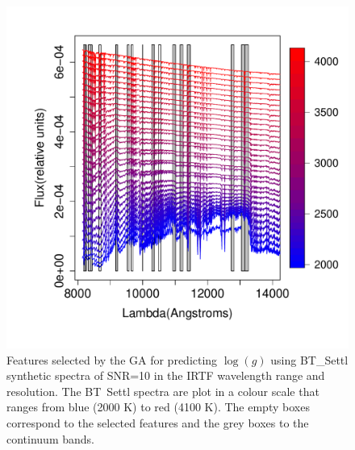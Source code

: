 \begin {figure}
 \centering
  \includegraphics[scale=0.55]{figs/BT-spectraAtIRTF-10-logg}
  \caption{Features selected by the GA for predicting $\log(g)$ using
    BT\_Settl synthetic spectra of SNR=10 in the IRTF wavelength range
    and resolution. The BT\ Settl spectra are plot in a colour scale
    that ranges from blue (2000 K) to red (4100 K). The empty boxes
    correspond to the selected features and the grey boxes to the
    continuum bands.}
\label{fig:irtf-teff}
\end {figure}

